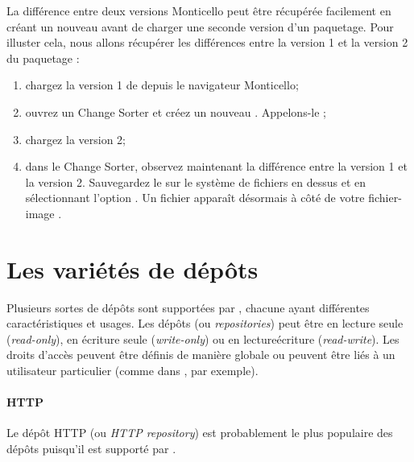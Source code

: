 \documentclass[a4paper,10pt,twoside]{book}
\begin{document}
La différence entre deux versions Monticello peut être récupérée facilement en créant un nouveau \changeset avant de charger une seconde version d'un paquetage.
Pour illuster cela, nous allons récupérer les différences entre la version 1 et la version 2 du paquetage :
\begin{enumerate}
\item chargez la version 1 de  depuis le navigateur Monticello;
\item ouvrez un Change Sorter et créez un nouveau \changeset. Appelons-le ;
\item chargez la version 2;
\item dans le Change Sorter, observez maintenant la différence entre la version 1 et la version 2. Sauvegardez le \changeset sur le système de fichiers en \actclickant dessus et en sélectionnant l'option . Un fichier  apparaît désormais à côté de votre fichier-image \pharo.
\end{enumerate}

\section{Les variétés de dépôts}%

Plusieurs sortes de dépôts sont supportées par
\MC, chacune ayant différentes caractéristiques et usages. Les dépôts
(ou \emph{repositories}) peut être en lecture seule
(\emph{read-only}), en écriture seule (\emph{write-only}) ou en
lecture\/écriture (\emph{read-write}). Les droits d'accès peuvent être
définis de manière globale ou peuvent être liés à un utilisateur
particulier (comme dans  \sqsrc, par exemple).

\paragraph{HTTP} Le dépôt HTTP (ou \emph{HTTP repository}) est
probablement le plus populaire des dépôts puisqu'il est supporté par 
 \sqsrc. %
\end{document}
